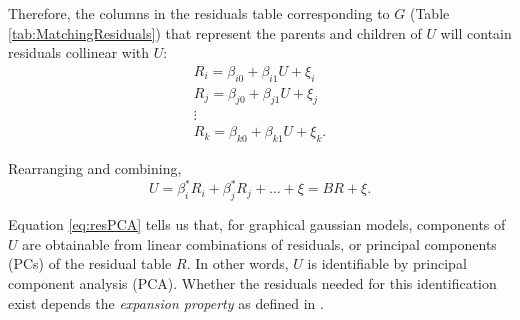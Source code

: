 \documentclass{article}
\begin{document}
\FloatBarrier
\begin{center}
\begin{table}[h]
\centering
\captionsetup{font=scriptsize}
\qquad
\qquad
\qquad
\qquad
{}
\bigskip
\caption{The training data frame (left) implies a matching residual data frame (right) once the joint distribution of all variables is specified via a graph and its parameterization}
\label{tab:MatchingResiduals}
\vspace{-5mm}
\end{table}
\end{center}
\FloatBarrier

Therefore, the columns in the residuals table corresponding to $G$ (Table \ref{tab:MatchingResiduals}) that represent the parents and children of $U$ will contain residuals collinear with $U$:
\begin{equation}
\begin{split}
R_i = \beta_{i0} + \beta_{i1} U + \xi_i\\
R_j = \beta_{j0} + \beta_{j1} U + \xi_j\\
\vdots\\
R_k = \beta_{k0} + \beta_{k1} U + \xi_k.
\end{split}
\end{equation}

Rearranging and combining,
\begin{equation}
U = \beta_i^{*} R_i + \beta_j^{*} R_j + \dots + \xi = B R + \xi.
\label{eq:resPCA}
\end{equation}

Equation \ref{eq:resPCA} tells us that, for graphical gaussian models, components of $U$ are obtainable from linear combinations of residuals, or principal components (PCs) of the residual table $R$.  In other words, $U$ is identifiable by principal component analysis (PCA).  Whether the residuals needed for this identification exist depends the \textit{expansion property} as defined in \cite{anandkumar_learning_2013}.
\end{document}
